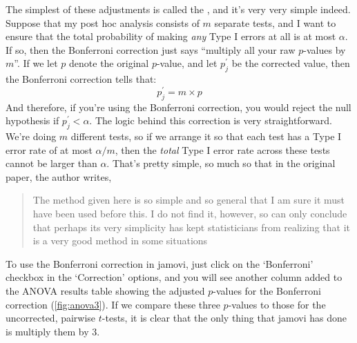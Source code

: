 
The simplest of these adjustments is called the  \parencite{Dunn1961}, and it's very very simple indeed. Suppose that my post hoc analysis consists of $m$ separate tests, and I want to ensure that the total probability of making {\it any} Type I errors at all is at most $\alpha$. If so, then the Bonferroni correction just says ``multiply all your raw $p$-values by $m$''. If we let $p$ denote the original $p$-value, and let $p^\prime_j$ be the corrected value, then the Bonferroni correction tells that:
$$
p^\prime_j = m \times p
$$
And therefore, if you're using the Bonferroni correction, you would reject the null hypothesis if $p^\prime_j < \alpha$. The logic behind this correction is very straightforward. We're doing $m$ different tests, so if we arrange it so that each test has a Type I error rate of at most $\alpha / m$, then the {\it total} Type I error rate across these tests cannot be larger than $\alpha$. That's pretty simple, so much so that in the original paper, the author writes,
\begin{quote}
The method given here is so simple and so general that I am sure it must have been used before this. I do not find it, however, so can only conclude that perhaps its very simplicity has kept statisticians from realizing that it is a very good method in some situations \parencite[pp 52-53]{Dunn1961}
\end{quote}
To use the Bonferroni correction in jamovi, just click on the `Bonferroni' checkbox in the `Correction' options, and you will see another column added to the ANOVA results table showing the adjusted $p$-values for the Bonferroni correction (\ref{fig:anova3}). If we compare these three $p$-values to those for the uncorrected, pairwise $t$-tests, it is clear that the only thing that jamovi has done is multiply them by 3. 


